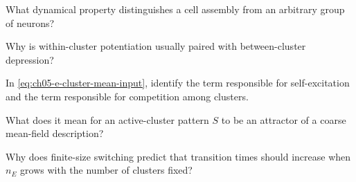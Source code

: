 \begin{conceptquestions}
  \item What dynamical property distinguishes a cell assembly from an arbitrary
  group of neurons?

  \item Why is within-cluster potentiation usually paired with between-cluster
  depression?

  \item In \cref{eq:ch05-e-cluster-mean-input}, identify the term responsible for
  self-excitation and the term responsible for competition among clusters.

  \item What does it mean for an active-cluster pattern $S$ to be an attractor
  of a coarse mean-field description?

  \item Why does finite-size switching predict that transition times should
  increase when $n_E$ grows with the number of clusters fixed?
\end{conceptquestions}
